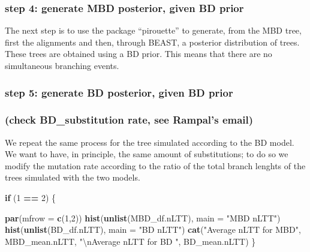 \documentclass[]{article}
\newenvironment{Shaded}{\begin{snugshade}}{\end{snugshade}}
\newcommand{\KeywordTok}[1]{\textcolor[rgb]{0.13,0.29,0.53}{\textbf{#1}}}
\newcommand{\DataTypeTok}[1]{\textcolor[rgb]{0.13,0.29,0.53}{#1}}
\newcommand{\DecValTok}[1]{\textcolor[rgb]{0.00,0.00,0.81}{#1}}
\newcommand{\CharTok}[1]{\textcolor[rgb]{0.31,0.60,0.02}{#1}}
\newcommand{\StringTok}[1]{\textcolor[rgb]{0.31,0.60,0.02}{#1}}
\newcommand{\ControlFlowTok}[1]{\textcolor[rgb]{0.13,0.29,0.53}{\textbf{#1}}}
\newcommand{\OperatorTok}[1]{\textcolor[rgb]{0.81,0.36,0.00}{\textbf{#1}}}
\newcommand{\NormalTok}[1]{#1}
\begin{document}
\subsubsection{step 4: generate MBD posterior, given BD
prior}\label{step-4-generate-mbd-posterior-given-bd-prior}

The next step is to use the package ``pirouette'' to generate, from the
MBD tree, first the alignments and then, through BEAST, a posterior
distribution of trees. These trees are obtained using a BD prior. This
means that there are no simultaneous branching events.

\subsubsection{step 5: generate BD posterior, given BD
prior}\label{step-5-generate-bd-posterior-given-bd-prior}

\subsubsection{(check BD\_substitution rate, see Rampal's
email)}\label{check-bd_substitution-rate-see-rampals-email}

We repeat the same process for the tree simulated according to the BD
model. We want to have, in principle, the same amount of substitutions;
to do so we modify the mutation rate according to the ratio of the total
branch lenghts of the trees simulated with the two models.

\begin{Shaded}
\begin{Highlighting}[]
\ControlFlowTok{if}\NormalTok{ (}\DecValTok{1} \OperatorTok{==}\StringTok{ }\DecValTok{2}\NormalTok{) \{}
  
  \KeywordTok{par}\NormalTok{(}\DataTypeTok{mfrow =} \KeywordTok{c}\NormalTok{(}\DecValTok{1}\NormalTok{,}\DecValTok{2}\NormalTok{))}
  \KeywordTok{hist}\NormalTok{(}\KeywordTok{unlist}\NormalTok{(MBD_df.nLTT), }\DataTypeTok{main =} \StringTok{"MBD nLTT"}\NormalTok{)}
  \KeywordTok{hist}\NormalTok{(}\KeywordTok{unlist}\NormalTok{(BD_df.nLTT), }\DataTypeTok{main =} \StringTok{"BD nLTT"}\NormalTok{)}
  \KeywordTok{cat}\NormalTok{(}\StringTok{"Average nLTT for MBD"}\NormalTok{, MBD_mean.nLTT, }\StringTok{"}\CharTok{\textbackslash{}n}\StringTok{Average nLTT for BD "}\NormalTok{, BD_mean.nLTT)}
\NormalTok{\}}
\end{Highlighting}
\end{Shaded}
\end{document}
